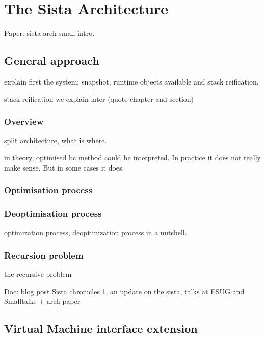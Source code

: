 \documentclass[a4paper,12pt,twoside]{../includes/ThesisStyle}
\begin{document}
\fi

\chapter{The Sista Architecture}
\label{chap:archTheory}
\minitoc

Paper: sista arch
small intro. 

\section{General approach}

explain first the system: snapshot, runtime objects available and stack reification.

stack reification we explain later (quote chapter and section) 

\subsection {Overview}

split architecture, what is where. 

in theory, optimised bc method could be interpreted. In practice it does not really make sense. But in some cases it does.

\subsection {Optimisation process}



\subsection {Deoptimisation process}

optimization process, deoptimization process in a nutshell.

\subsection{Recursion problem}

the recursive problem

Doc: blog post Sista chronicles 1, an update on the sista, talks at ESUG and Smalltalks + arch paper

\section{Virtual Machine interface extension}
\end{document}
